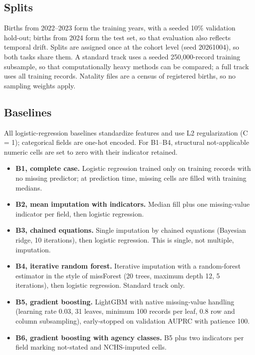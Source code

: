 \documentclass[journal]{IEEEtran}
\begin{document}
\subsection{Splits}

Births from 2022--2023 form the training years, with a seeded 10\% validation hold-out; births from 2024 form the test set, so that evaluation also reflects temporal drift. Splits are assigned once at the cohort level (seed 20261004), so both tasks share them. A standard track uses a seeded 250,000-record training subsample, so that computationally heavy methods can be compared; a full track uses all training records. Natality files are a census of registered births, so no sampling weights apply.

\subsection{Baselines}

All logistic-regression baselines standardize features and use L2 regularization (C = 1); categorical fields are one-hot encoded. For B1--B4, structural not-applicable numeric cells are set to zero with their indicator retained.

\begin{itemize}
\item
  \textbf{B1, complete case.} Logistic regression trained only on training records with no missing predictor; at prediction time, missing cells are filled with training medians.
\item
  \textbf{B2, mean imputation with indicators.} Median fill plus one missing-value indicator per field, then logistic regression.
\item
  \textbf{B3, chained equations.} Single imputation by chained equations \cite{vanbuuren2011} (Bayesian ridge, 10 iterations), then logistic regression. This is single, not multiple, imputation.
\item
  \textbf{B4, iterative random forest.} Iterative imputation with a random-forest estimator in the style of missForest \cite{stekhoven2012} (20 trees, maximum depth 12, 5 iterations), then logistic regression. Standard track only.
\item
  \textbf{B5, gradient boosting.} LightGBM \cite{ke2017} with native missing-value handling (learning rate 0.03, 31 leaves, minimum 100 records per leaf, 0.8 row and column subsampling), early-stopped on validation AUPRC with patience 100.
\item
  \textbf{B6, gradient boosting with agency classes.} B5 plus two indicators per field marking not-stated and NCHS-imputed cells.
\end{itemize}
\end{document}
